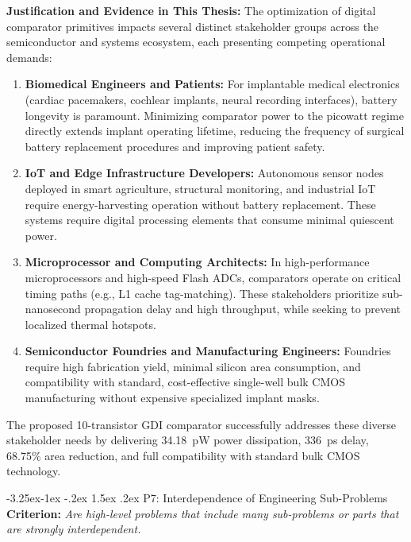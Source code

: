 \documentclass[12pt,a4paper,oneside]{report}
\makeatletter
\renewcommand\subsubsection{\@startsection{subsubsection}{3}{\z@}%
                                     {-3.25ex\@plus -1ex \@minus -.2ex}%
                                     {1.5ex \@plus .2ex}%
                                     {\normalfont\normalsize\itshape}}
\makeatother
\begin{document}
\noindent\textbf{Justification and Evidence in This Thesis:}
The optimization of digital comparator primitives impacts several distinct stakeholder groups across the semiconductor and systems ecosystem, each presenting competing operational demands:
\begin{enumerate}
\item \textbf{Biomedical Engineers and Patients:} For implantable medical electronics (cardiac pacemakers, cochlear implants, neural recording interfaces), battery longevity is paramount. Minimizing comparator power to the picowatt regime directly extends implant operating lifetime, reducing the frequency of surgical battery replacement procedures and improving patient safety.
\item \textbf{IoT and Edge Infrastructure Developers:} Autonomous sensor nodes deployed in smart agriculture, structural monitoring, and industrial IoT require energy-harvesting operation without battery replacement. These systems require digital processing elements that consume minimal quiescent power.
\item \textbf{Microprocessor and Computing Architects:} In high-performance microprocessors and high-speed Flash ADCs, comparators operate on critical timing paths (e.g., L1 cache tag-matching). These stakeholders prioritize sub-nanosecond propagation delay and high throughput, while seeking to prevent localized thermal hotspots.
\item \textbf{Semiconductor Foundries and Manufacturing Engineers:} Foundries require high fabrication yield, minimal silicon area consumption, and compatibility with standard, cost-effective single-well bulk CMOS manufacturing without expensive specialized implant masks.
\end{enumerate}
The proposed 10-transistor GDI comparator successfully addresses these diverse stakeholder needs by delivering 34.18~pW power dissipation, 336~ps delay, 68.75\% area reduction, and full compatibility with standard bulk CMOS technology.

\subsubsection{P7: Interdependence of Engineering Sub-Problems}
\textbf{Criterion:} \textit{Are high-level problems that include many sub-problems or parts that are strongly interdependent.}
\end{document}
